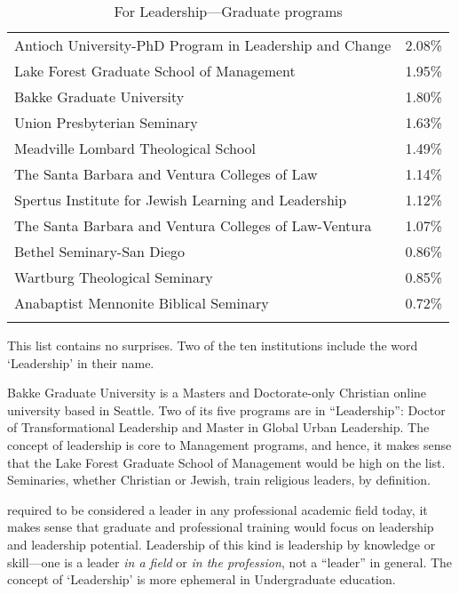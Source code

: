  \begin{longtable}[!t]{ | p{10cm} | R{2.5cm} |   }
\hline 

 & \\ \hline
Antioch University-PhD Program in Leadership and Change&2.08\%\\ \hline
Lake Forest Graduate School of Management&1.95\%\\ \hline
Bakke Graduate University&1.80\%\\ \hline
Union Presbyterian Seminary&1.63\%\\ \hline
Meadville Lombard Theological School&1.49\%\\ \hline
The Santa Barbara and Ventura Colleges of Law&1.14\%\\ \hline
Spertus Institute for Jewish Learning and Leadership&1.12\%\\ \hline
The Santa Barbara and Ventura Colleges of Law-Ventura&1.07\%\\ \hline
Bethel Seminary-San Diego&0.86\%\\ \hline
Wartburg Theological Seminary&0.85\%\\ \hline
Anabaptist Mennonite Biblical Seminary&0.72\%\\ \hline
            \caption{For Leadership---Graduate programs}
\label{table: forLeadGraduate}
\end{longtable}

This list contains no surprises. Two of the ten institutions include the word `Leadership' in their name.

Bakke Graduate University is a Masters and Doctorate-only Christian online university based in Seattle. Two of its five programs are in ``Leadership'': Doctor of Transformational Leadership and Master in Global Urban Leadership. The concept of leadership is core to Management programs, and hence, it makes sense that the Lake Forest Graduate School of Management would be high on the list. Seminaries, whether Christian or Jewish, train religious leaders, by definition. 

 required to be considered a leader in any professional academic field today, it makes sense that graduate and professional training would focus on leadership and leadership potential. Leadership of this kind is leadership by knowledge or skill---one is a leader \emph{in a field} or \emph{in the profession}, not a ``leader'' in general. The concept of `Leadership' is more ephemeral in Undergraduate education.

